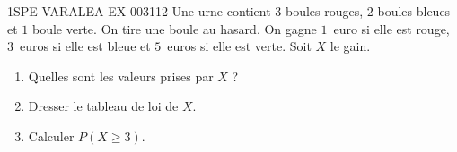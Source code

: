 \begin{exercice}{1SPE-VARALEA-EX-003}{1}{12}
Une urne contient $3$ boules rouges, $2$ boules bleues et $1$ boule verte. On tire une boule au hasard. On gagne $1$~euro si elle est rouge, $3$~euros si elle est bleue et $5$~euros si elle est verte. Soit $X$ le gain.

\begin{enumerate}
  \item Quelles sont les valeurs prises par $X$ ?
  \item Dresser le tableau de loi de $X$.
  \item Calculer $P(X \geq 3)$.
\end{enumerate}
\end{exercice}
